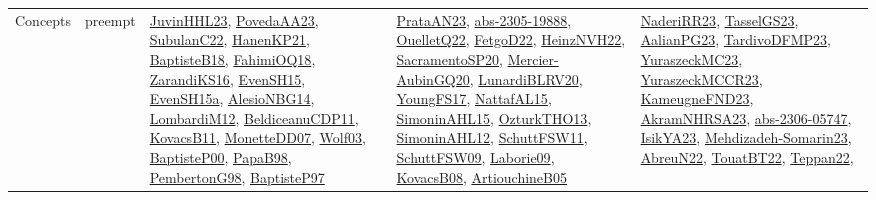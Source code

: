 {\begin{longtable}{lp{3cm}>{\raggedright}p{6cm}>{\raggedright}p{6cm}p{8cm}}
Concepts & preempt & \href{papers/JuvinHHL23.pdf}{JuvinHHL23}\cite{JuvinHHL23}, \href{papers/PovedaAA23.pdf}{PovedaAA23}\cite{PovedaAA23}, \href{articles/SubulanC22.pdf}{SubulanC22}\cite{SubulanC22}, \href{papers/HanenKP21.pdf}{HanenKP21}\cite{HanenKP21}, \href{articles/BaptisteB18.pdf}{BaptisteB18}\cite{BaptisteB18}, \href{articles/FahimiOQ18.pdf}{FahimiOQ18}\cite{FahimiOQ18}, \href{articles/ZarandiKS16.pdf}{ZarandiKS16}\cite{ZarandiKS16}, \href{papers/EvenSH15.pdf}{EvenSH15}\cite{EvenSH15}, \href{articles/EvenSH15a.pdf}{EvenSH15a}\cite{EvenSH15a}, \href{papers/AlesioNBG14.pdf}{AlesioNBG14}\cite{AlesioNBG14}, \href{articles/LombardiM12.pdf}{LombardiM12}\cite{LombardiM12}, \href{articles/BeldiceanuCDP11.pdf}{BeldiceanuCDP11}\cite{BeldiceanuCDP11}, \href{articles/KovacsB11.pdf}{KovacsB11}\cite{KovacsB11}, \href{papers/MonetteDD07.pdf}{MonetteDD07}\cite{MonetteDD07}, \href{papers/Wolf03.pdf}{Wolf03}\cite{Wolf03}, \href{articles/BaptisteP00.pdf}{BaptisteP00}\cite{BaptisteP00}, \href{articles/PapaB98.pdf}{PapaB98}\cite{PapaB98}, \href{papers/PembertonG98.pdf}{PembertonG98}\cite{PembertonG98}, \href{papers/BaptisteP97.pdf}{BaptisteP97}\cite{BaptisteP97} & \href{articles/PrataAN23.pdf}{PrataAN23}\cite{PrataAN23}, \href{articles/abs-2305-19888.pdf}{abs-2305-19888}\cite{abs-2305-19888}, \href{papers/OuelletQ22.pdf}{OuelletQ22}\cite{OuelletQ22}, \href{articles/FetgoD22.pdf}{FetgoD22}\cite{FetgoD22}, \href{articles/HeinzNVH22.pdf}{HeinzNVH22}\cite{HeinzNVH22}, \href{articles/SacramentoSP20.pdf}{SacramentoSP20}\cite{SacramentoSP20}, \href{papers/Mercier-AubinGQ20.pdf}{Mercier-AubinGQ20}\cite{Mercier-AubinGQ20}, \href{articles/LunardiBLRV20.pdf}{LunardiBLRV20}\cite{LunardiBLRV20}, \href{papers/YoungFS17.pdf}{YoungFS17}\cite{YoungFS17}, \href{articles/NattafAL15.pdf}{NattafAL15}\cite{NattafAL15}, \href{articles/SimoninAHL15.pdf}{SimoninAHL15}\cite{SimoninAHL15}, \href{articles/OzturkTHO13.pdf}{OzturkTHO13}\cite{OzturkTHO13}, \href{papers/SimoninAHL12.pdf}{SimoninAHL12}\cite{SimoninAHL12}, \href{articles/SchuttFSW11.pdf}{SchuttFSW11}\cite{SchuttFSW11}, \href{papers/SchuttFSW09.pdf}{SchuttFSW09}\cite{SchuttFSW09}, \href{papers/Laborie09.pdf}{Laborie09}\cite{Laborie09}, \href{articles/KovacsB08.pdf}{KovacsB08}\cite{KovacsB08}, \href{papers/ArtiouchineB05.pdf}{ArtiouchineB05}\cite{ArtiouchineB05} & \href{articles/NaderiRR23.pdf}{NaderiRR23}\cite{NaderiRR23}, \href{papers/TasselGS23.pdf}{TasselGS23}\cite{TasselGS23}, \href{papers/AalianPG23.pdf}{AalianPG23}\cite{AalianPG23}, \href{papers/TardivoDFMP23.pdf}{TardivoDFMP23}\cite{TardivoDFMP23}, \href{papers/YuraszeckMC23.pdf}{YuraszeckMC23}\cite{YuraszeckMC23}, \href{articles/YuraszeckMCCR23.pdf}{YuraszeckMCCR23}\cite{YuraszeckMCCR23}, \href{papers/KameugneFND23.pdf}{KameugneFND23}\cite{KameugneFND23}, \href{articles/AkramNHRSA23.pdf}{AkramNHRSA23}\cite{AkramNHRSA23}, \href{articles/abs-2306-05747.pdf}{abs-2306-05747}\cite{abs-2306-05747}, \href{articles/IsikYA23.pdf}{IsikYA23}\cite{IsikYA23}, \href{papers/Mehdizadeh-Somarin23.pdf}{Mehdizadeh-Somarin23}\cite{Mehdizadeh-Somarin23}, \href{articles/AbreuN22.pdf}{AbreuN22}\cite{AbreuN22}, \href{papers/TouatBT22.pdf}{TouatBT22}\cite{TouatBT22}, \href{papers/Teppan22.pdf}{Teppan22}\cite{Teppan22}, 
\end{longtable}}
